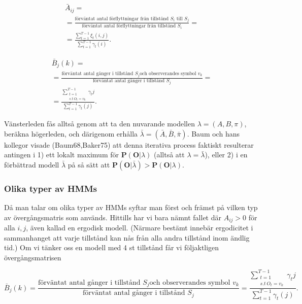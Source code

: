 \documentclass[../rapport_MVEX01-11-05]{subfiles}
\begin{document}
\begin{multline*}
\bar{A}_{ij} = \\ = \frac{\text{förväntat antal förflyttningar från
    tillstånd $S_i$ till $S_j$}}{\text{förväntat antal förflyttningar
    från tillstånd $S_i$}} = \\ =
\frac{\sum_{t=1}^{T-1}\xi_t(i,j)}{\sum_{t=1}^{T-1}\gamma_t(i)}.
\end{multline*}

\begin{multline*}
\bar{B}_j(k) = \\ = \frac{\text{förväntat antal gånger i tillstånd $S_j$
    och observerandes symbol $v_k$}}{\text{förväntat antal gånger i
    tillstånd $S_j$}} = \\ = \frac{\sum_{\substack{t=1\\s.t~ O_t =
      v_k}}^{T-1}\gamma_t{j}}{\sum_{t=1}^{T-1}\gamma_t(j)}.
\end{multline*}

Vänsterleden fås alltså genom att ta den nuvarande modellen $\lambda =
(A,B,\pi)$, beräkna högerleden, och därigenom erhålla $\bar{\lambda} =
(\bar{A},\bar{B}, \bar{\pi})$. Baum och hans kollegor visade
(Baum68,Baker75) att denna iterativa process faktiskt resulterar
antingen i 1) ett lokalt maximum för $\textbf{P}(\textbf{O}|\lambda)$
(alltså att $\lambda = \bar{\lambda}$), eller 2) i en förbättrad
modell $\bar{\lambda}$ på så sätt att
$\textbf{P}(\textbf{O}|\bar{\lambda}) > \textbf{P}(\textbf{O}|\lambda)$. 

\subsubsection{Olika typer av HMMs}

Då man talar om olika typer av HMMs syftar man först och främst på
vilken typ av övergångsmatris som används. Hittills har vi bara nämnt
fallet där $A_{ij} > 0$ för alla $i,j$, även kallad en ergodisk
modell. (Närmare bestämt innebär ergodicitet i sammanhanget att varje
tillstånd kan nås från alla andra tillstånd inom ändlig tid.) Om vi
tänker oss en modell med 4 st tillstånd får vi följaktligen övergångsmatrisen

\begin{equation*}
\bar{B}_j(k) = \frac{\text{förväntat antal gånger i tillstånd $S_j$
    och observerandes symbol $v_k$}}{\text{förväntat antal gånger i
    tillstånd $S_j$}} = \frac{\sum_{\substack{t=1\\s.t~ O_t =
      v_k}}^{T-1}\gamma_t{j}}{\sum_{t=1}^{T-1}\gamma_t(j)}.
\end{equation*}
\end{document}
